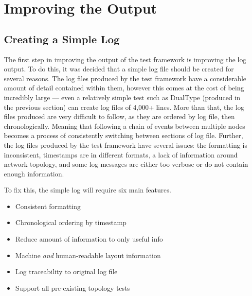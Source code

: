 \chapter{Improving the Output} %

\label{Chapter5} %



\section{Creating a Simple Log}

The first step in improving the output of the test framework is improving the log output.
To do this, it was decided that a simple log file should be created for several reasons.
The log files produced by the test framework have a considerable amount of detail contained within them, however this comes at the cost of being incredibly large — even a relatively simple test such as DualType (produced in the previous section) can create log files of 4,000+ lines.
More than that, the log files produced are very difficult to follow, as they are ordered by log file, then chronologically.
Meaning that following a chain of events between multiple nodes becomes a process of consistently switching between sections of log file.
Further, the log files produced by the test framework have several issues: the formatting is inconsistent, timestamps are in different formats, a lack of information around network topology, and some log messages are either too verbose or do not contain enough information.

To fix this, the simple log will require six main features.
\begin{itemize}
    \item Consistent formatting
    \item Chronological ordering by timestamp
    \item Reduce amount of information to only useful info
    \item Machine \emph{and} human-readable layout information
    \item Log traceability to original log file
    \item Support all pre-existing topology tests
\end{itemize}


